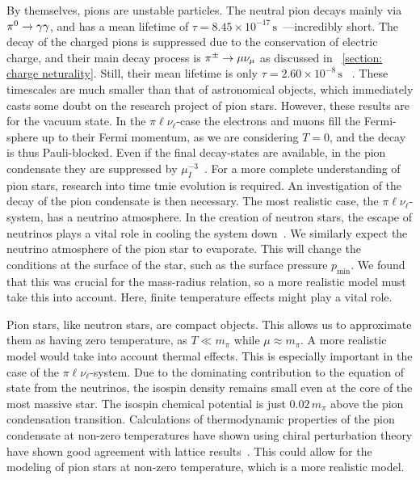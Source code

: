 By themselves, pions are unstable particles.
The neutral pion decays mainly via ${\pi^0}\rightarrow \gamma\gamma$, and has a mean lifetime of $\tau = 8.45\times 10^{-17}\,\text{s}$~\autocite{particledatagroupReviewParticlePhysics2020}---incredibly short.
The decay of the charged pions is suppressed due to the conservation of electric charge, and their main decay process is ${\pi^\pm}\rightarrow \mu \nu_\mu$ as discussed in
%
~\autoref{section: charge neturality}.
%
Still, their mean lifetime is only $\tau = 2.60\times 10^{-8}\,\text{s}$
%
~\autocite{particledatagroupReviewParticlePhysics2020}.
%
These timescales are much smaller than that of astronomical objects, which immediately casts some doubt on the research project of pion stars.
However, these results are for the vacuum state.
In the $\pi\ell\nu_\ell$-case the electrons and muons fill the Fermi-sphere up to their Fermi momentum, as we are considering $T = 0$, and the decay is thus Pauli-blocked.
Even if the final decay-states are available, in the pion condensate they are suppressed by $\mu_I^{-3}$~\autocite{brandtNewClassCompact2018}. 
For a more complete understanding of pion stars, research into time tmie evolution is required.
An investigation of the decay of the pion condensate is then necessary.
The most realistic case, the $\pi\ell\nu_\ell$-system, has a neutrino atmosphere.
In the creation of neutron stars, the escape of neutrinos plays a vital role in cooling the system down~\autocite{glendenningCompactStarsNuclear2012}.
We similarly expect the neutrino atmosphere of the pion star to evaporate.
This will change the conditions at the surface of the star, such as the surface pressure $p_\text{min}$.
We found that this was crucial for the mass-radius relation, so a more realistic model must take this into account.
Here, finite temperature effects might play a vital role.


Pion stars, like neutron stars, are compact objects.
This allows us to approximate them as having zero temperature, as $T\ll m_\pi$ while $\mu \approx m_\pi$.
A more realistic model would take into account thermal effects.
This is especially important in the case of the $\pi\ell\nu_\ell$-system.
Due to the dominating contribution to the equation of state from the neutrinos, the isospin density remains small even at the core of the most massive star.
The isospin chemical potential is just $0.02\,m_\pi$ above the pion condensation transition.
Calculations of thermodynamic properties of the pion condensate at non-zero temperatures have shown using chiral perturbation theory have shown good agreement with lattice results~\autocite{adhikariCondensatesPressureTwoflavor2021}.
This could allow for the modeling of pion stars at non-zero temperature, which is a more realistic model.


